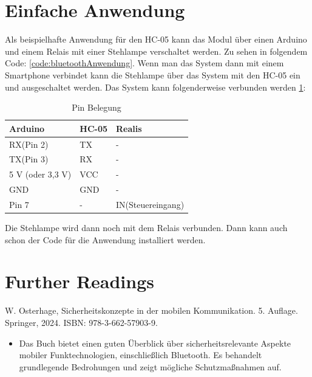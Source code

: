 \begin{code}[H]
	\caption{Code zur Überprüfung der Funktionalität}
	\label{code:bluetoothEinfach}
\end{code}



\section{Einfache Anwendung}
Als beispielhafte Anwendung für den HC-05 kann das Modul über einen Arduino und einem Relais mit einer Stehlampe verschaltet  werden. Zu sehen in folgendem Code: \ref{code:bluetoothAnwendung}. Wenn man das System dann mit einem Smartphone verbindet kann die Stehlampe über das System mit den HC-05 ein und ausgeschaltet werden. Das System kann folgenderweise verbunden werden \ref{tab:Pin Belegung}: 
\begin{table}[h]
	\centering
	\caption{Pin Belegung}
	\begin{tabular}{|l|l|l|}
		\hline
		\textbf{Arduino} & \textbf{HC-05} & \textbf{Realis}\\ \hline
		RX(Pin 2) 		 & 		TX 		  &        -       \\ \hline
		TX(Pin 3)		 &		RX		  &		   -	   \\ \hline
		5 V (oder 3,3 V)   &		VCC		  &		   -	   \\ \hline
		GND				 &		GND		  &		   -       \\ \hline
		Pin 7			 &       -		  &IN(Steuereingang)\\ \hline
	\end{tabular}
	\label{tab:Pin Belegung}
\end{table}

Die Stehlampe wird dann noch mit dem Relais verbunden. Dann kann auch schon der Code für die Anwendung installiert werden.

\begin{code}[H]
	\caption{Code zur Überprüfung der Funktionalität}
	\label{code:bluetoothAnwendung}
\end{code}



\section{Further Readings}
W. Osterhage, Sicherheitskonzepte in der mobilen Kommunikation. 5. Auflage. Springer, 2024. ISBN:  978-3-662-57903-9.\cite{Osterhage:2018}
\begin{itemize}
	\item Das Buch bietet einen guten Überblick über sicherheitsrelevante Aspekte mobiler Funktechnologien, einschließlich Bluetooth. Es behandelt grundlegende Bedrohungen und zeigt mögliche Schutzmaßnahmen auf.
\end{itemize}

